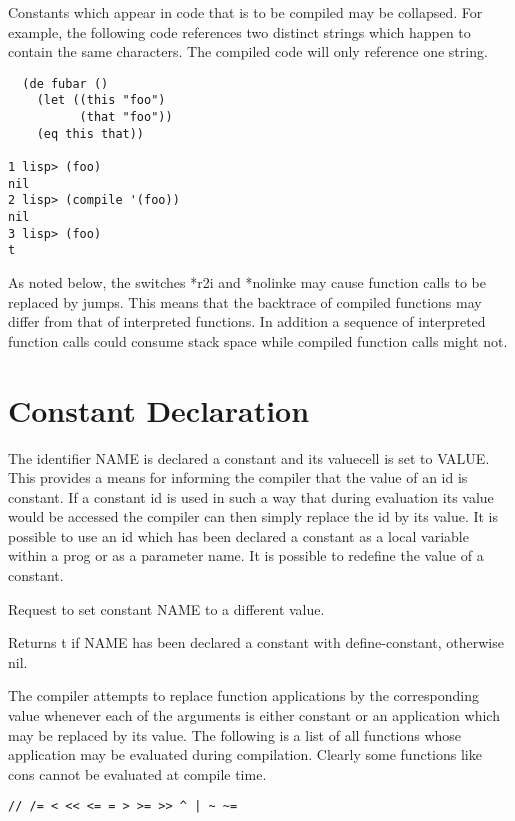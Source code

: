   Constants which appear in code that is to be compiled  may  be
collapsed.  For  example,  the  following  code  references  two
distinct strings which happen to contain  the  same  characters.
The compiled code will only reference one string.

\begin{verbatim}
  (de fubar ()
    (let ((this "foo")
          (that "foo"))
    (eq this that))

1 lisp> (foo)
nil
2 lisp> (compile '(foo))
nil
3 lisp> (foo)
t
\end{verbatim}
  As  noted  below,  the  switches  *r2i  and *nolinke may cause
function calls to be replaced by  jumps.  This  means  that  the
backtrace   of  compiled  functions  may  differ  from  that  of
interpreted functions. In addition  a  sequence  of  interpreted
function calls could consume stack space while compiled function
calls might not.


\section{Constant Declaration}


{    The identifier NAME is declared a constant and its valuecell
    is set to VALUE.  This provides a means  for  informing  the
    compiler that the value of an id is constant.  If a constant
    id  is  used  in such a way that during evaluation its value
    would be accessed the compiler can then simply  replace  the
    id  by its value. It is possible to use an id which has been
    declared a constant as a local variable within a prog or  as
    a parameter name.  It is possible to redefine the value of a
    constant.
}

    Request to set constant NAME to a different value.


{    Returns  t  if  NAME  has  been  declared  a  constant  with
    define-constant, otherwise nil.
}

  The compiler attempts to replace function applications by  the
corresponding  value  whenever  each  of the arguments is either
constant or an application which may be replaced by  its  value.
The  following  is a list of all functions whose application may
be evaluated during compilation.  Clearly  some  functions  like
cons cannot be evaluated at compile time.

\begin{verbatim}
// /= < << <= = > >= >> ^ | ~ ~=
\end{verbatim}

